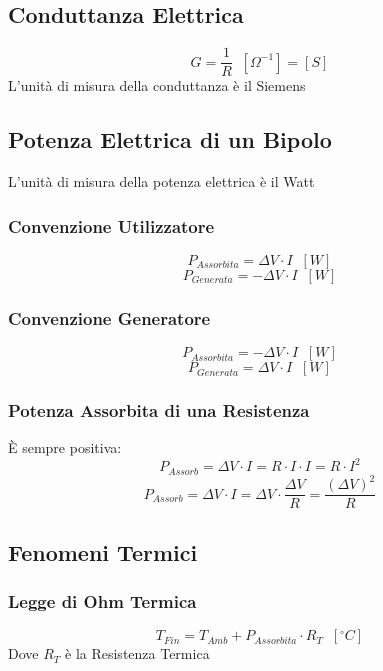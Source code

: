 \documentclass[../main.tex]{subfiles}
\begin{document}
	\subsection{Conduttanza Elettrica}
	\begin{equation}
		G = \frac{1}{R} \;\; [\Omega ^{-1}] = [S]
	\end{equation}
	L'unità di misura della conduttanza è il Siemens
	\subsection{Potenza Elettrica di un Bipolo}
	L'unità di misura della potenza elettrica è il Watt
	\subsubsection{Convenzione Utilizzatore}
	\begin{equation}
		P_{Assorbita} = \Delta V \cdot I \;\; [W]
	\end{equation}
	\begin{equation}
		P_{Generata} = -\Delta V \cdot I \;\; [W]
	\end{equation}
	\subsubsection{Convenzione Generatore}
	\begin{equation}
		P_{Assorbita} = -\Delta V \cdot I \;\; [W]
	\end{equation}
	\begin{equation}
		P_{Generata} = \Delta V \cdot I \;\; [W]
	\end{equation}
	\subsubsection{Potenza Assorbita di una Resistenza}
	È sempre positiva:
	\begin{equation}
		P_{Assorb} = \Delta V \cdot I = R \cdot I \cdot I = R \cdot I^2 
	\end{equation}
	\begin{equation}
		P_{Assorb} = \Delta V \cdot I = \Delta V \cdot \frac{\Delta V}{R} = \frac{(\Delta V)^2}{R}
	\end{equation}
	\subsection{Fenomeni Termici}
	\subsubsection{Legge di Ohm Termica}
	\begin{equation}
		T_{Fin} = T_{Amb} + P_{Assorbita} \cdot R_T \;\; [^\circ C]
	\end{equation}
	Dove $R_T$ è la Resistenza Termica
\end{document}

